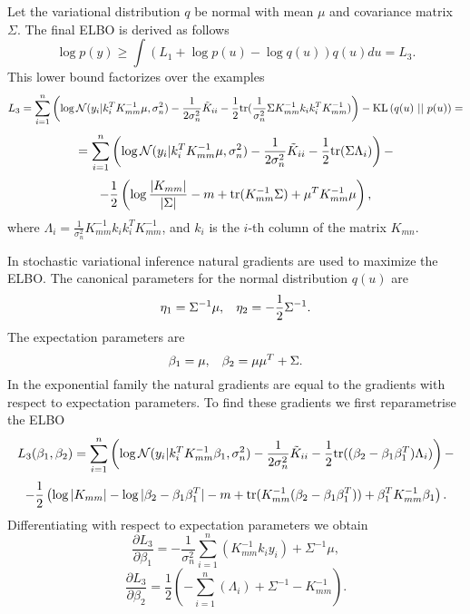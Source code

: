 Let the variational distribution $q$ be normal with mean $\mu$ and covariance matrix $\Sigma$. The final ELBO is derived as follows
\begin{equation}\label{L3}
	\log p(y) \ge \int \left( L_1 + \log p(u) - \log q(u)\right) q(u) du = L_3.
\end{equation}
This lower bound factorizes over the examples 
$$L_3 = \sum_{i = 1}^{n} \left( \log \mathcal{N}(y_i | k_i^T K_{mm}^{-1} \mu, \sigma_n^2) - \frac 1 {2 \sigma_n^2} \tilde K_{ii} - \frac 1 2 \mbox{tr} (\frac 1 {\sigma_n^2} \Sigma K_{mm}^{-1} k_i k_i^T K_{mm}^{-1}) \right) - \mbox{KL}\left(q(u)\mbox{ || }p(u)\right) = $$
$$ = \sum_{i = 1}^{n} \left( \log \mathcal{N}(y_i | k_i^T K_{mm}^{-1} \mu, \sigma_n^2) - \frac 1 {2 \sigma_n^2} \tilde K_{ii} - \frac 1 2 \mbox{tr} (\Sigma \Lambda_i) \right) - $$
$$ -\frac 1 2 \left (\log \frac {|K_{mm}|} {|\Sigma|} - m + \mbox{tr}(K_{mm}^{-1} \Sigma) + \mu^T K_{mm}^{-1} \mu \right),$$
where $\Lambda_i = \frac 1 {\sigma_n^2} K_{mm}^{-1} k_i k_i^T K_{mm}^{-1}$, and $k_i$ is the $i$-th column of the matrix $K_{mn}$.

In stochastic variational inference natural gradients are used to maximize the ELBO. The canonical parameters for the normal distribution $q(u)$ are
$$\eta_1 = \Sigma^{-1} \mu, \hspace{0.3cm}\eta_2 = - \frac 1 2 \Sigma^{-1}.$$
The expectation parameters are
$$\beta_1 = \mu, \hspace{0.3cm}\beta_2 = \mu \mu^T + \Sigma.$$
In the exponential family the natural gradients are equal to the gradients with respect to expectation parameters. To find these gradients we first reparametrise the ELBO
$$L_3(\beta_1, \beta_2) =  \sum_{i = 1}^{n} \left( \log \mathcal{N}(y_i | k_i^T K_{mm}^{-1} \beta_1, \sigma_n^2) - \frac 1 {2 \sigma_n^2} \tilde K_{ii} - \frac 1 2 \mbox{tr} ((\beta_2 - \beta_1 \beta_1^T) \Lambda_i) \right) - $$
$$ -\frac 1 2 \left (\log |K_{mm}| - \log |\beta_2 - \beta_1 \beta_1^T| - m + \mbox{tr}(K_{mm}^{-1} (\beta_2 - \beta_1 \beta_1^T)) + \beta_1^T K_{mm}^{-1} \beta_1 \right).$$
Differentiating with respect to expectation parameters we obtain
\begin{equation}
	\label{natgrad1}
	\frac{\partial L_3} {\partial\beta_1} =  -\frac 1 {\sigma_n^2}  \sum_{i = 1}^{n} \left(K_{mm}^{-1} k_i y_i \right) + \Sigma^{-1} \mu,
\end{equation}
\begin{equation}
	\label{natgrad2}
	\frac{\partial L_3} {\partial\beta_2} = \frac 1 {2} \left(-\sum_{i = 1}^{n} (\Lambda_i) + \Sigma^{-1}  - K_{mm}^{-1}\right).
\end{equation}

